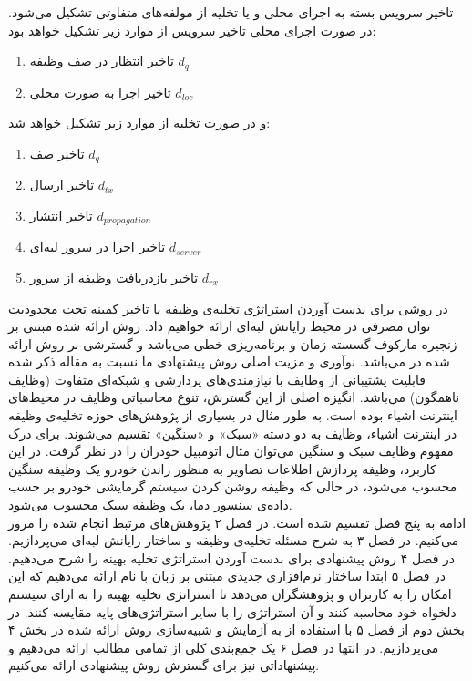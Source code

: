 تاخیر سرویس بسته به اجرای محلی و یا تخلیه از مولفه‌های متفاوتی تشکیل می‌شود. در صورت اجرای محلی تاخیر سرویس از موارد زیر تشکیل خواهد بود:
\begin{enumerate}
	\item تاخیر انتظار در صف وظیفه $d_q$
	\item تاخیر اجرا به صورت محلی $d_{l o c}$
\end{enumerate}
و در صورت تخلیه از موارد زیر تشکیل خواهد شد:
\begin{enumerate}
	\item تاخیر صف $d_q$
	\item تاخیر ارسال $d_{t x}$
	\item تاخیر انتشار $d_{p r o p a g a t i o n}$
	\item تاخیر اجرا در سرور لبه‌ای $d_{s e r v e r}$
	\item تاخیر بازدریافت وظیفه از سرور $d_{r x}$
\end{enumerate}
\newpage
در \CurrentProject روشی برای بدست آوردن استراتژی تخلیه‌ی وظیفه با تاخیر کمینه تحت محدودیت توان مصرفی در محیط رایانش لبه‌ای ارائه خواهیم داد. روش ارائه شده مبتنی بر زنجیره مارکوف گسسته-زمان و برنامه‌ریزی خطی می‌باشد و گسترشی بر روش ارائه شده در \cite{Liu} می‌باشد. نوآوری و مزیت اصلی روش پیشنهادی ما نسبت به مقاله ذکر شده قابلیت پشتیبانی از وظایف با نیازمندی‌های پردازشی و شبکه‌ای متفاوت (وظایف ناهمگون) می‌باشد. انگیزه اصلی از این گسترش، تنوع محاسباتی وظایف در محیط‌های اینترنت اشیاء بوده است. به طور مثال در بسیاری از پژوهش‌های حوزه تخلیه‌ی وظیفه در اینترنت اشیاء، وظایف به دو دسته «سبک» و «سنگین» تقسیم می‌شوند. \cite{yousefpour} \cite{tran} برای درک مفهوم وظایف سبک و سنگین می‌توان مثال اتومبیل خودران را در نظر گرفت. در این کاربرد، وظیفه پردازش اطلاعات تصاویر به منظور راندن خودرو یک وظیفه سنگین محسوب می‌شود، در حالی که وظیفه‌ روشن کردن سیستم گرمایشی خودرو بر حسب داده‌ی سنسور دما، یک وظیفه سبک محسوب می‌شود. \\

ادامه \CurrentProject به پنج فصل تقسیم شده است. در فصل ۲ پژوهش‌های مرتبط انجام شده را مرور می‌کنیم. در فصل ۳ به شرح مسئله تخلیه‌ی وظیفه و ساختار رایانش لبه‌ای می‌پردازیم. در فصل ۴ روش پیشنهادی برای بدست آوردن استراتژی تخلیه بهینه را شرح می‌دهیم. در فصل ۵ ابتدا ساختار نرم‌افزاری جدیدی مبتنی بر زبان  با نام  ارائه می‌دهیم که این امکان را به کاربران و پژوهشگران می‌دهد تا استراتژی تخلیه بهینه را به ازای سیستم دلخواه خود محاسبه کنند و آن استراتژی را با سایر استراتژی‌های پایه مقایسه کنند. در بخش دوم از فصل ۵ با استفاده از  به آزمایش و شبیه‌سازی روش ارائه شده در بخش ۴ می‌پردازیم. در انتها در فصل ۶ یک جمع‌بندی کلی از تمامی مطالب ارائه می‌دهیم و پیشنهاداتی نیز برای گسترش روش پیشنهادی ارائه می‌کنیم.


\clearpage
